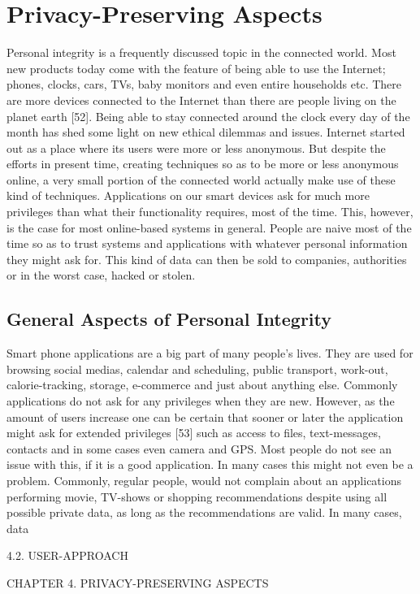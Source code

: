 \chapter{Privacy-Preserving Aspects}
Personal integrity is a frequently discussed topic in the connected world.
Most new products today come with the feature of being able to use the Internet; phones, clocks, cars, TVs, baby monitors and even entire households etc.
There are more devices connected to the Internet than there are people living on the planet earth [52]. Being able to stay connected around the clock every day of the month has shed some light on new ethical dilemmas and issues. Internet started out as a place where its users were more or less anonymous. But despite the efforts in present time, creating techniques so as to be more or less anonymous online, a very small portion of the connected world actually make use of these kind of techniques. Applications on our smart devices ask for much more privileges than what their functionality
requires, most of the time. This, however, is the case for most online-based systems in general. People are naive most of the time so as to trust systems and applications with whatever personal information they might ask for. This kind of data can then be sold to companies, authorities or in the worst case, hacked or stolen.

\section{General Aspects of Personal Integrity}
Smart phone applications are a big part of many people’s lives. They are used for browsing social medias, calendar and scheduling, public transport, work-out, calorie-tracking, storage, e-commerce and just about anything else. Commonly applications do not ask for any privileges when they are new. However, as the amount of users increase one can be certain that sooner or later the application might ask for extended privileges [53] such as access to files, text-messages, contacts and in some cases even camera and GPS. Most people do not see an issue with this, if it is a good application. In many cases this might not even be a problem. Commonly, regular people, would not complain about an applications performing movie, TV-shows or shopping recommendations despite using all possible private data, as long as the recommendations are valid. In many cases, data


4.2. USER-APPROACH

CHAPTER 4. PRIVACY-PRESERVING ASPECTS

